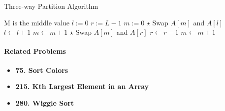 \begin{algorithm}[H]
\caption{Three-way Partition Algorithm}
\begin{algorithmic}[1]
 \Comment M is the middle value
\State $l:=0$
\State $r:=L-1$
\State $m:=0$
\State $\star$ Swap $A[m]$ and $A[l]$
\State $l\gets l+1$
\State $m\gets m+1$
\State $\star$ Swap $A[m]$ and $A[r]$
\State $r\gets r-1$
\Else
\State $m\gets m+1$
\EndIf
\EndWhile
\EndProcedure
\end{algorithmic}
\end{algorithm}

\paragraph{Related Problems}
\begin{itemize}
\item \textbf{75. Sort Colors}
\item \textbf{215. Kth Largest Element in an Array}
\item \textbf{280. Wiggle Sort}
\end{itemize}
